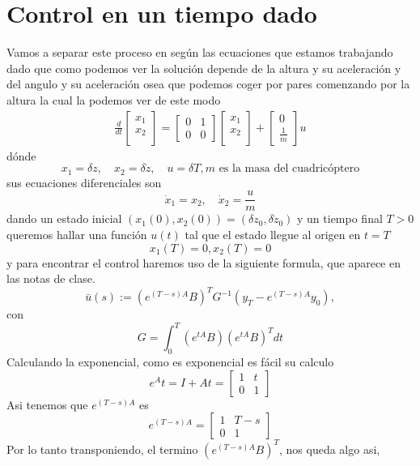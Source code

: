 \documentclass{uofa-eng-assignment}
\begin{document}
\section{Control en un tiempo dado}
Vamos a separar este proceso en según las ecuaciones que estamos trabajando dado que como podemos ver la solución
depende de la altura y su aceleración y del angulo y su aceleración osea que podemos coger por pares comenzando 
por la altura la cual la podemos ver de este modo
\begin{align*}
    \frac{d}{dt}
    \begin{bmatrix}
        x_1 \\
        x_2 \\
    \end{bmatrix}
    = \begin{bmatrix}
        0 & 1 \\
        0 & 0
    \end{bmatrix}\begin{bmatrix}
        x_1 \\
        x_2 \\
    \end{bmatrix} + 
    \begin{bmatrix}
    0 \\
     \frac{1}{m} 
    \end{bmatrix}
    u
\end{align*}
dónde 
\[
x_1 = \delta z, \quad x_2 = \delta \dot{z}, \quad u = \delta T, m \text{ es la masa del cuadricóptero}
\]
sus ecuaciones diferenciales son 
\[
\dot{x}_1 = x_2 , \quad \dot{x}_2= \frac{u}{m}
\]
dando un estado inicial $(x_1(0),x_2(0))= (\delta z_0, \delta \dot{z}_0)$ y un tiempo final $T >0$ queremos hallar una función $u(t)$
tal que el estado llegue al origen en $t= T$
\[
x_1(T) = 0, x_2(T)=0
\]
y para encontrar el control haremos uso de la siguiente formula, que aparece en las notas de clase.
\[
\bar{u}(s) := \left( e^{(T-s)A} B \right)^T G^{-1} \left( y_T - e^{(T-s)A} y_0 \right),
\tag{2.12}
\]
con 
\[
G = \int_{0}^{T} \left( e^{tA} B \right) \left( e^{tA} B \right)^T dt
\]
Calculando la exponencial, como es exponencial es fácil su calculo
\[
e^At = I+At = \begin{bmatrix}
    1 & t \\
    0 & 1
\end{bmatrix}
\]
Asi tenemos que $e^{(T-s)A}$ es 
\[
e^{(T-s)A} = \begin{bmatrix}
    1 & T-s \\
    0 & 1
\end{bmatrix}
\]
Por lo tanto transponiendo, el termino $(e^{(T-s)A}B)^T$, nos queda algo asi,
\end{document}
